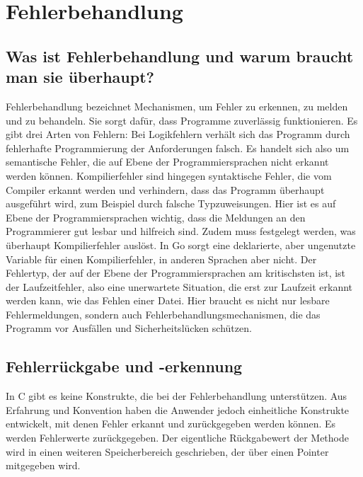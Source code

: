\section{Fehlerbehandlung}
\label{sec:Fehlerbehandlung}
\subsection{Was ist Fehlerbehandlung und warum braucht man sie überhaupt?}
Fehlerbehandlung bezeichnet Mechanismen, um Fehler zu erkennen, zu melden und zu behandeln. Sie sorgt dafür, dass Programme zuverlässig funktionieren. Es gibt drei Arten von Fehlern: Bei Logikfehlern verhält sich das Programm durch fehlerhafte Programmierung der Anforderungen falsch. Es handelt sich also um semantische Fehler, die auf Ebene der Programmiersprachen nicht erkannt werden können. Kompilierfehler sind hingegen syntaktische Fehler, die vom Compiler erkannt werden und verhindern, dass das Programm überhaupt ausgeführt wird, zum Beispiel durch falsche Typzuweisungen. Hier ist es auf Ebene der Programmiersprachen wichtig, dass die Meldungen an den Programmierer gut lesbar und hilfreich sind. Zudem muss festgelegt werden, was überhaupt Kompilierfehler auslöst. In Go sorgt eine deklarierte, aber ungenutzte Variable für einen Kompilierfehler, in anderen Sprachen aber nicht. Der Fehlertyp, der auf der Ebene der Programmiersprachen am kritischsten ist, ist der Laufzeitfehler, also eine unerwartete Situation, die erst zur Laufzeit erkannt werden kann, wie das Fehlen einer Datei. Hier braucht es nicht nur lesbare Fehlermeldungen, sondern auch Fehlerbehandlungsmechanismen, die das Programm vor Ausfällen und Sicherheitslücken schützen.

\subsection{Fehlerrückgabe und -erkennung}
In C gibt es keine Konstrukte, die bei der Fehlerbehandlung unterstützen. Aus Erfahrung und Konvention haben die Anwender jedoch einheitliche Konstrukte entwickelt, mit denen Fehler erkannt und zurückgegeben werden können. Es werden Fehlerwerte zurückgegeben. Der eigentliche Rückgabewert der Methode wird in einen weiteren Speicherbereich geschrieben, der über einen Pointer mitgegeben wird.

\begin{figure}[htp]
	\centering
	
	\label{fig:errorcode_in_c}
\end{figure}

